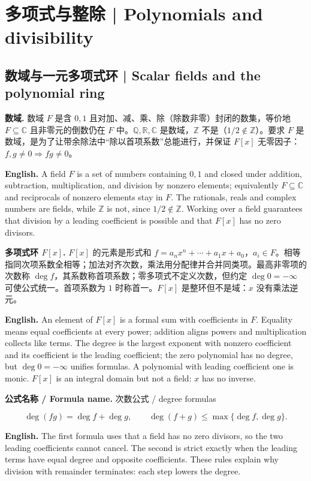 \documentclass[UTF8,11pt,a4paper]{ctexart}
\newcommand{\EN}[1]{\par\noindent\textbf{English.} #1\par}
\newcommand{\FORMULA}[2]{\par\noindent\textbf{公式名称 / Formula name.} #1 / #2\par}
\begin{document}
\section{多项式与整除 | Polynomials and divisibility}
\subsection{数域与一元多项式环 | Scalar fields and the polynomial ring}
\noindent\textbf{数域.} 数域 $F$ 是含 $0,1$ 且对加、减、乘、除（除数非零）封闭的数集，等价地 $F\subseteq\mathbb C$ 且非零元的倒数仍在 $F$ 中。$\mathbb Q,\mathbb R,\mathbb C$ 是数域，$\mathbb Z$ 不是（$1/2\notin\mathbb Z$）。要求 $F$ 是数域，是为了让带余除法中“除以首项系数”总能进行，并保证 $F[x]$ 无零因子：$f,g\ne0\Rightarrow fg\ne0$。
\EN{A field $F$ is a set of numbers containing $0,1$ and closed under addition, subtraction, multiplication, and division by nonzero elements; equivalently $F\subseteq\mathbb C$ and reciprocals of nonzero elements stay in $F$. The rationals, reals and complex numbers are fields, while $\mathbb Z$ is not, since $1/2\notin\mathbb Z$. Working over a field guarantees that division by a leading coefficient is possible and that $F[x]$ has no zero divisors.}
\noindent\textbf{多项式环 $F[x]$.} $F[x]$ 的元素是形式和 $f=a_nx^n+\cdots+a_1x+a_0$，$a_i\in F$。相等指同次项系数全相等；加法对齐次数，乘法用分配律并合并同类项。最高非零项的次数称 $\deg f$，其系数称首项系数；零多项式不定义次数，但约定 $\deg0=-\infty$ 可使公式统一。首项系数为 $1$ 时称首一。$F[x]$ 是整环但不是域：$x$ 没有乘法逆元。
\EN{An element of $F[x]$ is a formal sum with coefficients in $F$. Equality means equal coefficients at every power; addition aligns powers and multiplication collects like terms. The degree is the largest exponent with nonzero coefficient and its coefficient is the leading coefficient; the zero polynomial has no degree, but $\deg0=-\infty$ unifies formulas. A polynomial with leading coefficient one is monic. $F[x]$ is an integral domain but not a field: $x$ has no inverse.}
\FORMULA{次数公式}{degree formulas}
\[
\deg(fg)=\deg f+\deg g,\qquad \deg(f+g)\le\max\{\deg f,\deg g\}.
\]
\EN{The first formula uses that a field has no zero divisors, so the two leading coefficients cannot cancel. The second is strict exactly when the leading terms have equal degree and opposite coefficients. These rules explain why division with remainder terminates: each step lowers the degree.}
\end{document}
